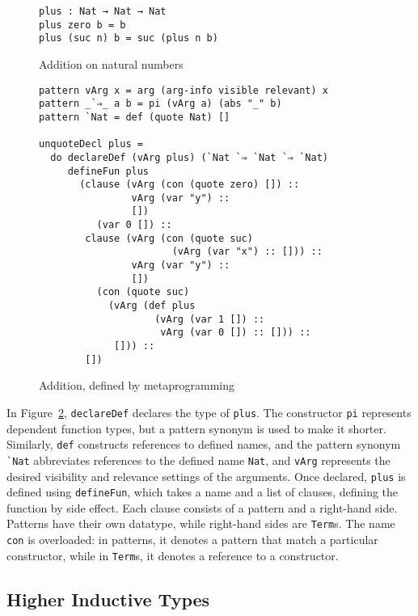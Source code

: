 \documentclass[sigplan,10pt]{acmart}
\begin{document}
\begin{figure}[h]
\begin{Verbatim}
plus : Nat → Nat → Nat
plus zero b = b
plus (suc n) b = suc (plus n b)
\end{Verbatim}
  \caption{Addition on natural numbers}
  \label{fig:plus}
\end{figure}

\begin{figure}
\begingroup
\fontsize{9pt}{10pt}\selectfont
\begin{Verbatim}
pattern vArg x = arg (arg-info visible relevant) x
pattern _`⇒_ a b = pi (vArg a) (abs "_" b)
pattern `Nat = def (quote Nat) []

unquoteDecl plus =
  do declareDef (vArg plus) (`Nat `⇒ `Nat `⇒ `Nat)
     defineFun plus
       (clause (vArg (con (quote zero) []) ::
                vArg (var "y") ::
                [])
          (var 0 []) ::
        clause (vArg (con (quote suc)
                       (vArg (var "x") :: [])) ::
                vArg (var "y") ::
                [])
          (con (quote suc)
            (vArg (def plus
                    (vArg (var 1 []) ::
                     vArg (var 0 []) :: [])) ::
             [])) ::
        [])
\end{Verbatim}
\endgroup
\caption{Addition, defined by metaprogramming}
\label{fig:plusmeta}
\end{figure}
\normalsize

In Figure~\ref{fig:plusmeta}, {\tt declareDef} declares the type of {\tt plus}.
The constructor {\tt pi} represents dependent function types, but a pattern synonym is used to make it shorter.
Similarly, \texttt{def} constructs references to defined names, and the pattern synonym \Verb|`Nat| abbreviates references to the defined name \texttt{Nat}, and {\tt vArg} represents the desired visibility and relevance settings of the arguments.
Once declared, \texttt{plus} is defined using {\tt defineFun}, which takes a name and a list of clauses, defining the function by side effect.
Each clause consists of a pattern and a right-hand side.
Patterns have their own datatype, while right-hand sides are \texttt{Term}s.
The name \texttt{con} is overloaded: in patterns, it denotes a pattern that match a particular constructor, while in \texttt{Term}s, it denotes a reference to a constructor.


\subsection{Higher Inductive Types}
\label{sec:sec2.2}
\end{document}
